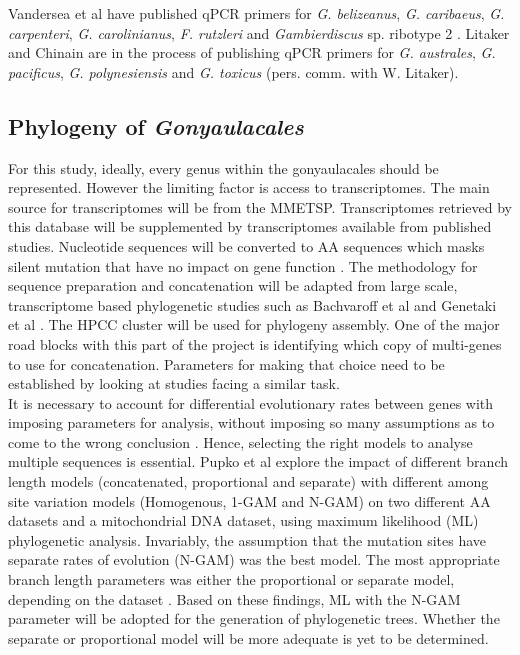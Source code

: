 \documentclass[12pt]{article}
\begin{document}
Vandersea et al have published qPCR primers for \emph{G. belizeanus}, \emph{G. caribaeus}, \emph{G. carpenteri}, \emph{G. carolinianus}, \emph{F. rutzleri} and \emph{Gambierdiscus} sp. ribotype 2 \cite{vandersea2012development}. Litaker and Chinain are in the process of publishing qPCR primers for \emph{G. australes}, \emph{G. pacificus}, \emph{G. polynesiensis} and \emph{G. toxicus} (pers. comm. with W. Litaker).

\subsection{Phylogeny of \emph{Gonyaulacales}}
For this study, ideally, every genus within the gonyaulacales should be represented. However the limiting factor is access to transcriptomes. The main source for transcriptomes will be from the MMETSP. Transcriptomes retrieved by this database will be supplemented by transcriptomes available from published studies. Nucleotide sequences will be converted to AA sequences which masks silent mutation that have no impact on gene function \cite{bachvaroff2014dinoflagellate}. The methodology for sequence preparation and concatenation will be adapted from large scale, transcriptome based phylogenetic studies such as Bachvaroff et al and Genetaki et al \cite{gentekaki2014large,bachvaroff2014dinoflagellate}. The HPCC cluster will be used for phylogeny assembly. One of the major road blocks with this part of the project is identifying which copy of multi-genes to use for concatenation. Parameters for making that choice need to be established by looking at studies facing a similar task.\\


It is necessary to account for differential evolutionary rates between genes with imposing parameters for analysis, without imposing so many assumptions as to come to the wrong conclusion \cite{pupko2002combining}. Hence, selecting the right models to analyse multiple sequences is essential. Pupko et al explore the impact of different branch length models (concatenated, proportional and separate) with different among site variation models (Homogenous, 1-GAM and N-GAM) on two different AA datasets and a mitochondrial DNA dataset, using maximum likelihood (ML) phylogenetic analysis. Invariably, the assumption that the mutation sites have separate rates of evolution (N-GAM) was the best model. The most appropriate branch length parameters was either the proportional or separate model, depending on the dataset \cite{pupko2002combining}. Based on these findings, ML with the N-GAM parameter will be adopted for the generation of phylogenetic trees. Whether the separate or proportional model will be more adequate is yet to be determined.\\
\end{document}
